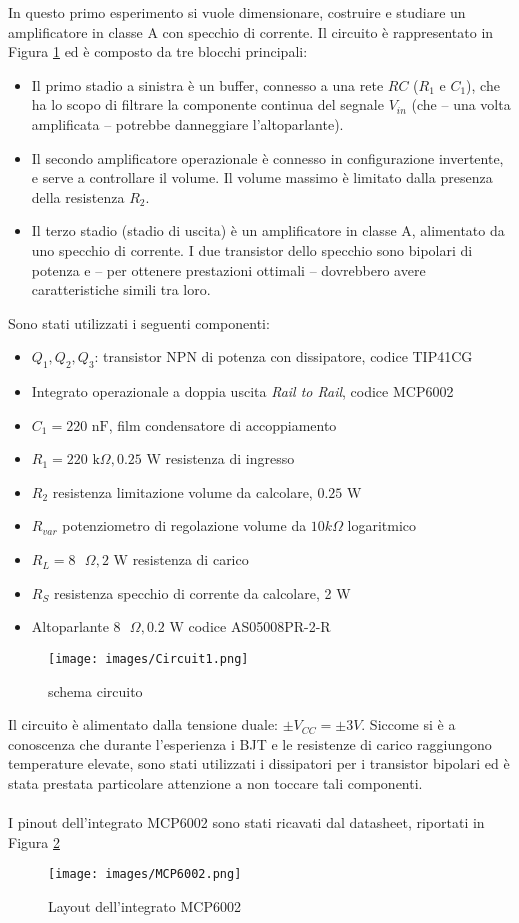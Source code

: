 In questo primo esperimento si vuole dimensionare, costruire e studiare un amplificatore in classe A con specchio di corrente. Il circuito è rappresentato in Figura \ref{fig:Circuit1} ed è composto da tre blocchi principali:
\begin{itemize}\label{ch:Spiegazione1}
    \item Il primo stadio a sinistra è un buffer, connesso a una rete $RC$ ($R_1$ e $C_1$), che ha lo scopo di filtrare la componente continua del segnale $V_{in}$ (che – una volta amplificata – potrebbe danneggiare l’altoparlante).
    \item Il secondo amplificatore operazionale è connesso in configurazione invertente, e serve a controllare il volume. Il volume massimo è limitato dalla presenza della resistenza $R_2$.
    \item Il terzo stadio (stadio di uscita) è un amplificatore in classe A, alimentato da uno specchio di corrente. I due transistor dello specchio sono bipolari di potenza e – per ottenere prestazioni ottimali – dovrebbero avere caratteristiche simili tra loro. 
\end{itemize}
Sono stati utilizzati i seguenti componenti:
\begin{itemize}
    \item $Q_1,Q_2,Q_3$: transistor NPN di potenza con dissipatore, codice TIP41CG
    \item Integrato operazionale a doppia uscita \textit{Rail to Rail}, codice MCP6002
    \item $C_1=220\text{ nF}$, film condensatore di accoppiamento
    \item $R_1=220\text{ k}\Omega, 0.25\text{ W}$ resistenza di ingresso
    \item $R_2$ resistenza limitazione volume da calcolare, $0.25\text{ W}$
    \item $R_{var}$ potenziometro di regolazione volume da $10k\Omega$ logaritmico
    \item $R_L=8\text{ }\Omega,2\text{ W}$ resistenza di carico
    \item $R_S$ resistenza specchio di corrente da calcolare, 2 W
    \item Altoparlante $8\text{ }\Omega,0.2\text{ W}$ codice AS05008PR-2-R
\end{itemize}
\begin{figure}[H]
    \centering
    \texttt{[image: images/Circuit1.png]}
    \caption{schema circuito}
    \label{fig:Circuit1}
\end{figure}
Il circuito è alimentato dalla tensione duale: $\pm V_{CC}=\pm 3V$. Siccome si è a conoscenza che durante l'esperienza i BJT e le resistenze di carico raggiungono temperature elevate, sono stati utilizzati i dissipatori per i transistor bipolari ed è stata prestata particolare attenzione a non toccare tali componenti.\\\\
I pinout dell'integrato MCP6002 sono stati ricavati dal datasheet, riportati in Figura \ref{fig:MCP6002}
\begin{figure}[H]
    \centering
    \texttt{[image: images/MCP6002.png]}
    \caption{Layout dell'integrato MCP6002 }
    \label{fig:MCP6002}
\end{figure}
